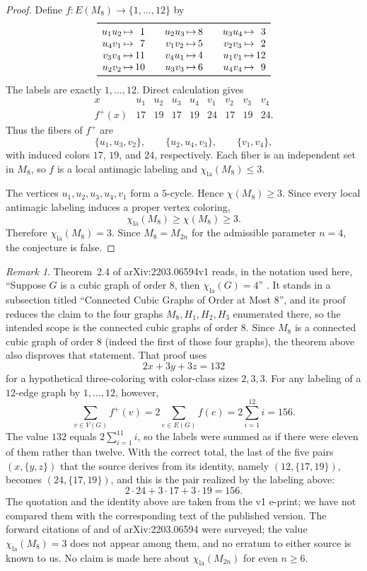 \documentclass[11pt]{amsart}
\theoremstyle{remark}
\newtheorem*{remark}{Remark}
\newcommand{\la}{\mathrm{la}}
\begin{document}
\begin{proof}
Define $f\colon E(M_8)\to\{1,\dots,12\}$ by
\[
\begin{array}{c@{\,\mapsto\,}r@{\qquad}
                c@{\,\mapsto\,}r@{\qquad}
                c@{\,\mapsto\,}r}
\toprule
u_1u_2&1&u_2u_3&8&u_3u_4&3\\
u_4v_1&7&v_1v_2&5&v_2v_3&2\\
v_3v_4&11&v_4u_1&4&u_1v_1&12\\
u_2v_2&10&u_3v_3&6&u_4v_4&9\\
\bottomrule
\end{array}
\]
The labels are exactly $1,\dots,12$. Direct calculation gives
\[
\begin{array}{c|cccccccc}
x&u_1&u_2&u_3&u_4&v_1&v_2&v_3&v_4\\
\hline
f^+(x)&17&19&17&19&24&17&19&24.
\end{array}
\]
Thus the fibers of $f^+$ are
\[
\{u_1,u_3,v_2\},\qquad
\{u_2,u_4,v_3\},\qquad
\{v_1,v_4\},
\]
with induced colors $17$, $19$, and $24$, respectively. Each fiber is
an independent set in $M_8$, so $f$ is a local antimagic labeling and
$\chi_{\la}(M_8)\le3$.

The vertices $u_1,u_2,u_3,u_4,v_1$ form a $5$-cycle. Hence
$\chi(M_8)\ge3$. Since every local antimagic labeling induces a proper
vertex coloring,
\[
\chi_{\la}(M_8)\ge\chi(M_8)\ge3.
\]
Therefore $\chi_{\la}(M_8)=3$. Since $M_8=M_{2n}$ for the admissible
parameter $n=4$, the conjecture is false.
\end{proof}

\begin{remark}
Theorem~2.4 of arXiv:2203.06594v1 reads, in the notation used here,
``Suppose $G$ is a cubic graph of order $8$, then $\chi_{\la}(G)=4$''
\cite{LauShiuPreprint}. It stands in a subsection titled ``Connected
Cubic Graphs of Order at Most 8'', and its proof reduces the claim to
the four graphs $M_8,H_1,H_2,H_3$ enumerated there, so the intended
scope is the connected cubic graphs of order $8$. Since $M_8$ is a
connected cubic graph of order $8$ (indeed the first of those four
graphs), the theorem above also disproves that statement. That proof
uses
\[
2x+3y+3z=132
\]
for a hypothetical three-coloring with color-class sizes $2,3,3$.
For any labeling of a $12$-edge graph by $1,\dots,12$, however,
\[
\sum_{v\in V(G)}f^+(v)
 =2\sum_{e\in E(G)}f(e)
 =2\sum_{i=1}^{12}i
 =156.
\]
The value $132$ equals $2\sum_{i=1}^{11}i$, so the labels were summed as
if there were eleven of them rather than twelve. With the correct total,
the last of the five pairs $(x,\{y,z\})$ that the source derives from its
identity, namely $(12,\{17,19\})$, becomes $(24,\{17,19\})$, and this is
the pair realized by the labeling above:
\[
2\cdot24+3\cdot17+3\cdot19=156.
\]
The quotation and the identity above are taken from the v1 e-print; we
have not compared them with the corresponding text of the published
version.
The forward citations of \cite{LauShiuNg} and of arXiv:2203.06594 were
surveyed; the value $\chi_{\la}(M_8)=3$ does not appear among them, and
no erratum to either source is known to us.
No claim is made here about $\chi_{\la}(M_{2n})$ for even $n\ge6$.
\end{remark}
\end{document}
